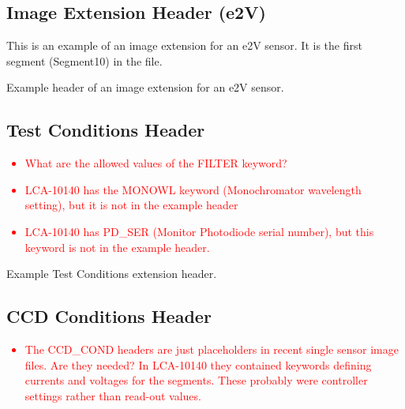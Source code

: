 \documentclass{article}[12pt]
\newcommand{\red}{\textcolor{red}}
\begin{document}
\subsection{Image Extension Header (e2V)}

This is an example of an image extension for an e2V sensor.  It is the first segment (Segment10) in the file.

\begin{table}
\begin{alltt}

\end{alltt}
\caption{Example header of an image extension for an e2V sensor.\label{tab:image_e2V}}
\end{table}

\subsection{Test Conditions Header}

\red{
\begin{itemize}
\item{What are the allowed values of the FILTER keyword?}
\item{LCA-10140 has the MONOWL keyword (Monochromator wavelength setting), but it is not in the example header}
\item{LCA-10140 has PD\_SER (Monitor Photodiode serial number), but this keyword is not in the example header.}
\end{itemize}
}

\begin{table}
\begin{alltt}

\end{alltt}
\caption{Example Test Conditions extension header.\label{table:test_cond}}
\end{table}

\subsection{CCD Conditions Header}

\red{
\begin{itemize}
\item{The CCD\_COND headers are just placeholders in recent single sensor image files.  Are they needed?  In LCA-10140 they contained keywords defining currents and voltages for the segments.  These probably were controller settings rather than read-out values.}
\end{itemize}
}
\end{document}

